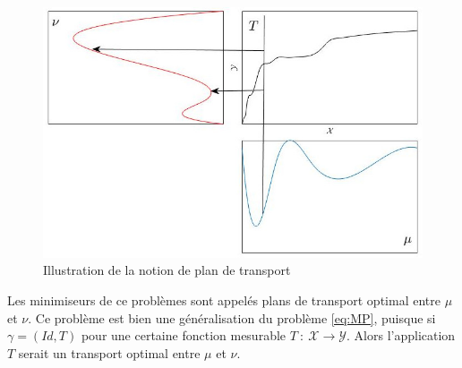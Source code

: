 \documentclass[a4paper,12pt]{article}
\begin{document}
\begin{figure}[!h]
\centering
\includegraphics[width=0.5\linewidth]{img/transport_plan.jpg}
\caption{Illustration de la notion de plan de transport}
\end{figure}

Les minimiseurs de ce problèmes sont appelés plans de transport optimal entre $\mu$ et $\nu$. Ce problème est bien une généralisation du problème \eqref{eq:MP}, puisque si $\gamma = (Id,T)$ pour une certaine fonction mesurable $T\ :\ \mathcal{X}\rightarrow\mathcal{Y}$. Alors l'application $T$ serait un transport optimal entre $\mu$ et $\nu$. \\
\end{document}
